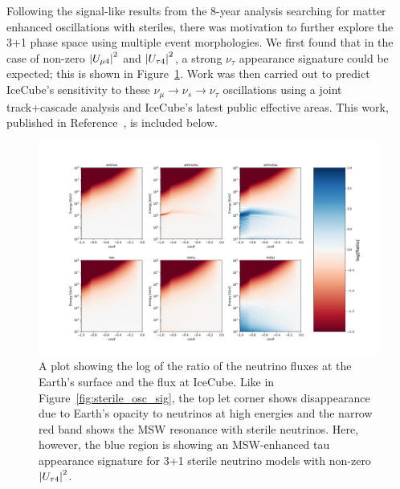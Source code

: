\documentclass[main.tex]{subfiles}
\begin{document}
Following the signal-like results from the 8-year analysis searching for matter enhanced oscillations with steriles, there was motivation to further explore the 3+1 phase space using multiple event morphologies. 
We first found that in the case of non-zero $\left| U_{\mu 4} \right|^{2}$ and $\left| U_{\tau 4} \right|^{2}$, a strong $\nu_{\tau}$ appearance signature could be expected; this is shown in Figure~\ref{fig:tau_oscillatiosn}.
Work was then carried out to predict IceCube's sensitivity to these $\nu_{\mu}\to\nu_{s}\to\nu_{\tau}$ oscillations using a joint track+cascade analysis and IceCube's latest public effective areas.
This work, published in Reference~\cite{PhysRevD.105.052001}, is included below.

\begin{figure}
    \centering
    \includegraphics[width=0.8\linewidth]{figures/flux_plot_tau_appear.png}
    \caption{A plot showing the log of the ratio of the neutrino fluxes at the Earth's surface and the flux at IceCube. Like in Figure~\ref{fig:sterile_osc_sig}, the top let corner shows disappearance due to Earth's opacity to neutrinos at high energies and the narrow red band shows the MSW resonance with sterile neutrinos. Here, however, the blue region is showing an MSW-enhanced tau appearance signature for 3+1 sterile neutrino models with non-zero $\left| U_{\tau4} \right|^{2}$.}\label{fig:tau_oscillatiosn}
\end{figure}


\end{document}
